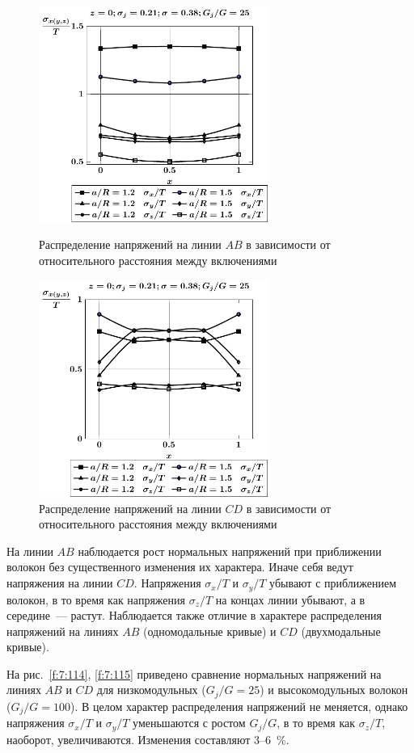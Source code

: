 \begin{figure}[h!]
\centering\footnotesize
\parbox[b]{7.5cm}{\centering\includegraphics[width=7.5cm]{inc24-a-h10-r10-g25-z0.pdf}
\caption{Распределение напряжений на линии $AB$ в зависимости от относительного расстояния между включениями
\label{f:7:112}}}\hfil\hfil
\parbox[b]{7.5cm}{\centering\includegraphics[width=7.5cm]{inc24-a-h10-r10-g25-z0-diag.pdf}
\caption{Распределение напряжений на линии $CD$ в зависимости от относительного расстояния между включениями
\label{f:7:113}}}
\end{figure}

На линии $AB$ наблюдается рост нормальных напряжений при приближении волокон без существенного изменения их характера. Иначе себя ведут напряжения на линии $CD$. Напряжения $\sigma_x/T$ и $\sigma_y/T$ убывают с приближением волокон, в то время как напряжения $\sigma_z/T$ на концах линии убывают, а в середине~--- растут. Наблюдается также отличие в характере распределения напряжений на линиях $AB$ (одномодальные кривые) и $CD$ (двухмодальные кривые).

На рис.~\ref{f:7:114}, \ref{f:7:115} приведено сравнение нормальных напряжений на линиях $AB$ и $CD$ для низкомодульных ($G_j/G=25$) и высокомодульных волокон ($G_j/G=100$). В целом характер распределения напряжений не меняется, однако напряжения $\sigma_x/T$ и $\sigma_y/T$ уменьшаются с ростом $G_j/G$, в то время как $\sigma_z/T$, наоборот, увеличиваются. Изменения составляют 3--6~\%.

